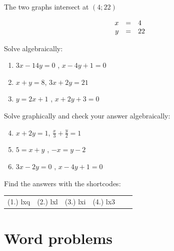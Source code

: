 \begin{wex}
{
The two graphs intersect at $(4;22)$ 

\begin{equation*}
\begin{array}{ccl}\hfill x& =& 4\hfill \\ \hfill y& =& 22\hfill \end{array}
\end{equation*}

}
\end{wex}

\begin{exercises}{}
{
\item Solve algebraically: 
\begin{enumerate}[noitemsep, label=\textbf{\arabic*}. ] 
\item $3x-14y=0$ , $x-4y+1=0$
\item $x+y=8$, $3x + 2y = 21$
\item $y=2x+1$ , $x + 2y + 3 = 0$
\end{enumerate}

Solve graphically and check your answer algebraically:

\begin{enumerate}[noitemsep, label=\textbf{\arabic*}. ] 
\setcounter{enumi}{3}
\item  $x+2y=1$, $\frac{x}{3} + \frac{y}{2} = 1$
\item $5= x+y$ , $-x = y-2$
\item $3x - 2y = 0$ , $x - 4y + 1 = 0$

\end{enumerate}


\par {} Find the answers with the shortcodes:
\par \begin{tabular}[h]{cccccc}
(1.) lxq  &  (2.) lxl  &  (3.) lxi  &  (4.) lx3  & \end{tabular}
}
\end{exercises}

\section{Word problems}

